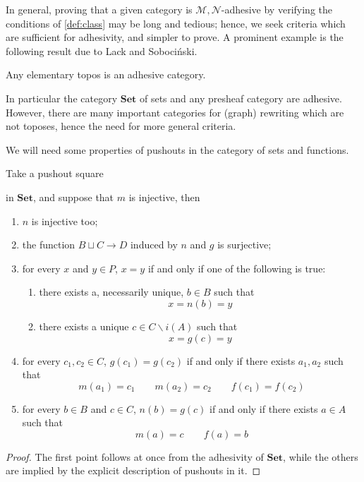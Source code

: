 \documentclass[runningheads,envcountsect]{lmcs}
\newcommand{\catname}[1]{\mathbf{#1}}
\theoremstyle{plain}
\theoremstyle{definition}
\begin{document}
In general, proving that a given category is $\mathcal{M}, \mathcal{N}$-adhesive by verifying  the conditions of \cref{def:class} may be long and tedious; hence, we seek criteria which are sufficient for adhesivity, and simpler to prove.
A prominent example is the following result due to Lack and Soboci{\'n}ski.
\begin{thm}
	Any elementary topos is an adhesive category.
\end{thm}
In particular the category $\catname{Set}$ of sets and any presheaf category are adhesive.
However, there are many important categories for (graph) rewriting which are not toposes, hence the need for more general criteria. 

We will need some properties of pushouts in the category of sets and functions.

\begin{lem}\label{lem:push} Take a pushout square
	\begin{center}
	\end{center}
	in $\catname{Set}$, and suppose that $m$ is injective, then
\begin{enumerate}
	\item $n$ is injective too;
	\item the function $B\sqcup C\to D$ induced by $n$ and $g$ is surjective;
	\item for every $x$ and $y\in P$, $x=y$  if and only if one of the following is true:
	\begin{enumerate}
		\item there exists a, necessarily unique, $b\in B$ such that 
		\[x=n(b)=y\]
		\item there exists a unique $c\in C\smallsetminus i(A)$ such that
		\[x=g(c)=y\]	
	\end{enumerate}
\item for every $c_1, c_2\in C$, $g(c_1)=g(c_2)$ if and only if there exists $a_1, a_2$ such that 
\[m(a_1)=c_1 \qquad m(a_2)=c_2 \qquad f(c_1)=f(c_2)\]
\item for every $b\in B$ and $c\in C$, $n(b)=g(c)$ if and only if there exists $a\in A$ such that
\[m(a)=c\qquad f(a)=b\] 
\end{enumerate}

\end{lem}
\begin{proof}The first point follows at once from the adhesivity of $\catname{Set}$, while the others are implied by the explicit description of pushouts in it.
\end{proof}
\end{document}
